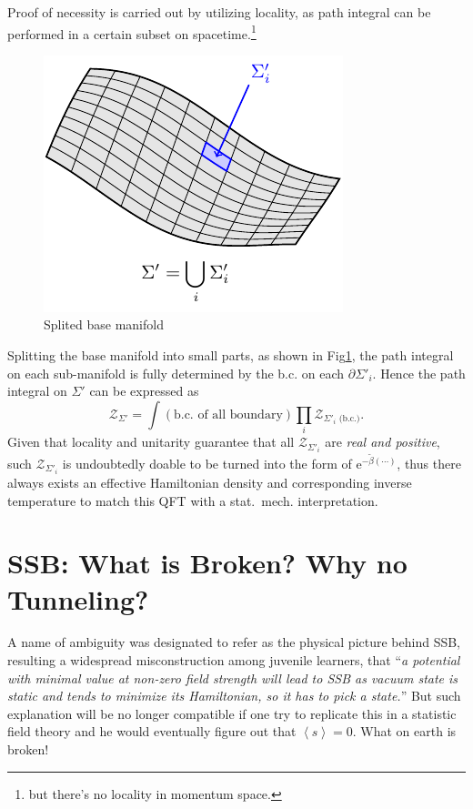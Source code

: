 Proof of necessity is carried out by utilizing locality, as path integral can be performed in a certain subset on spacetime.\footnote{but there's no locality in momentum space.}
\begin{figure}
    \centering
    \includegraphics{figures/splited_base_manifold.pdf}
    \caption{Splited base manifold}
    \label{split_manifold}
\end{figure}
Splitting the base manifold into small parts, as shown in Fig\ref{split_manifold}, the path integral on each sub-manifold is fully determined by the b.c. on each $\partial\Sigma'_{i}$. Hence the path integral on $\Sigma'$ can be expressed as
\begin{equation}
    \mathcal{Z}_{\Sigma'} = \int \left( \text{b.c. of all boundary} \right) \prod_{i} \mathcal{Z}_{\Sigma' _{i} \text{ (b.c.)}}.
\end{equation}
Given that locality and unitarity guarantee that all $\mathcal{Z}_{\Sigma'_{i}}$ are \emph{real and positive}, such $\mathcal{Z}_{\Sigma'_{i}}$ is undoubtedly doable to be turned into the form of $\mathrm{e}^{- \tilde{\beta} \left( \cdots \right) }$, thus there always exists an effective Hamiltonian density and corresponding inverse temperature to match this QFT with a stat.~mech. interpretation.


\section[When do Symmetries Break Spontaneously]{SSB: What is Broken? Why no Tunneling?}

A name of ambiguity was designated to refer as the physical picture behind SSB, resulting a widespread misconstruction among juvenile learners, that ``\emph{a potential with minimal value at non-zero field strength will lead to SSB as vacuum state is static and tends to minimize its Hamiltonian, so it has to pick a state.}'' But such explanation will be no longer compatible if one try to replicate this in a statistic field theory and he would eventually figure out that $\left< s \right> = 0$. What on earth is broken!

